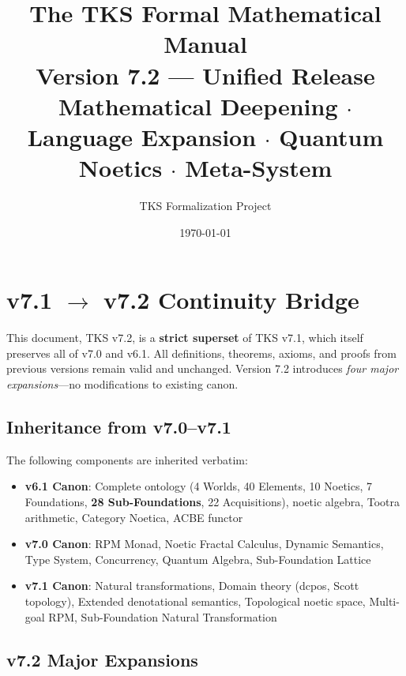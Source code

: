 \documentclass[11pt,twoside,openright]{book}
\title{\Huge\textbf{The TKS Formal Mathematical Manual}\\[0.5em]
       \Large Version 7.2 — Unified Release\\[0.3em]
       \large Mathematical Deepening $\cdot$ Language Expansion $\cdot$ Quantum Noetics $\cdot$ Meta-System}
\author{TKS Formalization Project}
\date{\today}
\theoremstyle{definition}
\theoremstyle{plain}
\theoremstyle{remark}
\begin{document}
\frontmatter
\maketitle


\chapter*{v7.1 $\to$ v7.2 Continuity Bridge}

\begin{tcolorbox}[colback=yellow!10!white,colframe=orange!75!black,title=\textbf{Canonical Inheritance Declaration}]
This document, TKS v7.2, is a \textbf{strict superset} of TKS v7.1, which itself preserves all of v7.0 and v6.1. All definitions, theorems, axioms, and proofs from previous versions remain valid and unchanged. Version 7.2 introduces \textit{four major expansions}---no modifications to existing canon.
\end{tcolorbox}

\section*{Inheritance from v7.0--v7.1}

The following components are inherited verbatim:
\begin{itemize}
  \item \textbf{v6.1 Canon}: Complete ontology (4 Worlds, 40 Elements, 10 Noetics, 7 Foundations, \textbf{28 Sub-Foundations}, 22 Acquisitions), noetic algebra, Tootra arithmetic, Category Noetica, ACBE functor
  \item \textbf{v7.0 Canon}: RPM Monad, Noetic Fractal Calculus, Dynamic Semantics, Type System, Concurrency, Quantum Algebra, Sub-Foundation Lattice
  \item \textbf{v7.1 Canon}: Natural transformations, Domain theory (dcpos, Scott topology), Extended denotational semantics, Topological noetic space, Multi-goal RPM, Sub-Foundation Natural Transformation
\end{itemize}

\section*{v7.2 Major Expansions}
\end{document}
